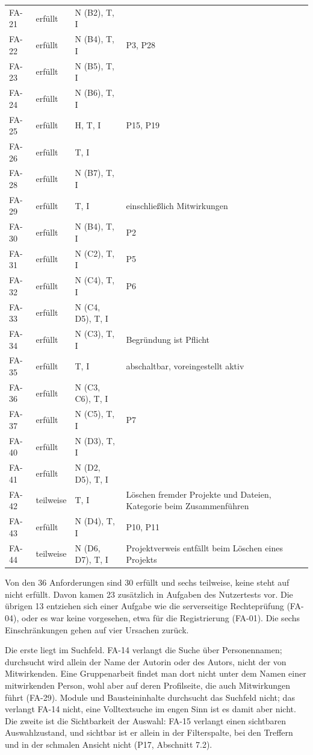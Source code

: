 \begin{longtable}{@{}L{1.4cm}L{1.9cm}L{3.4cm}L{6.9cm}@{}}
	FA-21 & erfüllt & N (B2), T, I & \\
	FA-22 & erfüllt & N (B4), T, I & P3, P28 \\
	FA-23 & erfüllt & N (B5), T, I & \\
	FA-24 & erfüllt & N (B6), T, I & \\
	FA-25 & erfüllt & H, T, I & P15, P19 \\
	FA-26 & erfüllt & T, I & \\
	FA-28 & erfüllt & N (B7), T, I & \\
	FA-29 & erfüllt & T, I & einschließlich Mitwirkungen \\
	FA-30 & erfüllt & N (B4), T, I & P2 \\
	FA-31 & erfüllt & N (C2), T, I & P5 \\
	FA-32 & erfüllt & N (C4), T, I & P6 \\
	FA-33 & erfüllt & N (C4, D5), T, I & \\
	FA-34 & erfüllt & N (C3), T, I & Begründung ist Pflicht \\
	FA-35 & erfüllt & T, I & abschaltbar, voreingestellt aktiv \\
	FA-36 & erfüllt & N (C3, C6), T, I & \\
	FA-37 & erfüllt & N (C5), T, I & P7 \\
	FA-40 & erfüllt & N (D3), T, I & \\
	FA-41 & erfüllt & N (D2, D5), T, I & \\
	FA-42 & teilweise & T, I & Löschen fremder Projekte und Dateien, Kategorie beim Zusammenführen \\
	FA-43 & erfüllt & N (D4), T, I & P10, P11 \\
	FA-44 & teilweise & N (D6, D7), T, I & Projektverweis entfällt beim Löschen eines Projekts \\
\end{longtable}
\endgroup

Von den 36 Anforderungen sind 30 erfüllt und sechs teilweise, keine steht auf nicht erfüllt. Davon kamen 23 zusätzlich in Aufgaben des Nutzertests vor. Die übrigen 13 entziehen sich einer Aufgabe wie die serverseitige Rechteprüfung (FA-04), oder es war keine vorgesehen, etwa für die Registrierung (FA-01). Die sechs Einschränkungen gehen auf vier Ursachen zurück.

Die erste liegt im Suchfeld. FA-14 verlangt die Suche über Personennamen; durchsucht wird allein der Name der Autorin oder des Autors, nicht der von Mitwirkenden. Eine Gruppenarbeit findet man dort nicht unter dem Namen einer mitwirkenden Person, wohl aber auf deren Profilseite, die auch Mitwirkungen führt (FA-29). Module und Bausteininhalte durchsucht das Suchfeld nicht; das verlangt FA-14 nicht, eine Volltextsuche im engen Sinn ist es damit aber nicht. Die zweite ist die Sichtbarkeit der Auswahl: FA-15 verlangt einen sichtbaren Auswahlzustand, und sichtbar ist er allein in der Filterspalte, bei den Treffern und in der schmalen Ansicht nicht (P17, Abschnitt 7.2).

